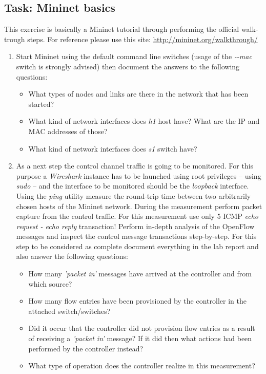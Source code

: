 \documentclass[a4paper]{article}
\begin{document}
\subsection{Task: Mininet basics} \label{task:Mininet}

This exercise is basically a Mininet tutorial through performing the official walk-trough steps. For reference please
use this site: \url{http://mininet.org/walkthrough/ }

\begin{enumerate}

    \item Start Mininet using the default command line switches (usage of the \emph{-{}-mac} switch is strongly
          advised)
          then document the answers to the following questions:
          \begin{itemize}
              \item What types of nodes and links are there in the network that has been started?
              \item What kind of network interfaces does \emph{h1} host have? What are the IP and MAC addresses of
                    those?
              \item What kind of network interfaces does \emph{s1} switch have?
          \end{itemize}

    \item As a next step the control channel traffic is going to be monitored. For this purpose a \emph{Wireshark}
          instance
          has to be launched using root privileges -- using \emph{sudo} -- and the interface to be monitored should be
          the
          \emph{loopback} interface. Using the \emph{ping} utility measure the round-trip time between two arbitrarily
          chosen hosts
          of the Mininet network. During the measurement perform packet capture from the control traffic. For this
          measurement use
          only 5 ICMP \emph{echo request - echo reply} transaction! Perform in-depth analysis of the OpenFlow messages
          and
          inspect the control message transactions step-by-step. For this step to be considered as complete document
          everything in
          the lab report and also answer the following questions:
          \begin{itemize}
              \item How many \emph{'packet in'} messages have arrived at the controller and from which source?
              \item How many flow entries have been provisioned by the controller in the attached switch/switches?
              \item Did it occur that the controller did not provision flow entries as a result of receiving a
                    \emph{'packet in'}
                    message? If it did then what actions had been performed by the controller instead?
              \item What type of operation does the controller realize in this measurement?
          \end{itemize}


\end{enumerate}
\end{document}
